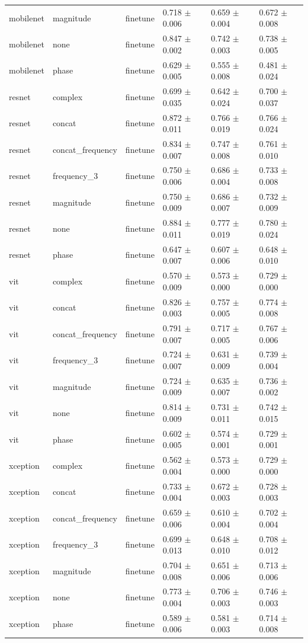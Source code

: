 \begin{table}
\begin{tabular}{llllll}
mobilenet & magnitude & finetune & 0.718 $\pm$ 0.006 & 0.659 $\pm$ 0.004 & 0.672 $\pm$ 0.008 \\
mobilenet & none & finetune & 0.847 $\pm$ 0.002 & 0.742 $\pm$ 0.003 & 0.738 $\pm$ 0.005 \\
mobilenet & phase & finetune & 0.629 $\pm$ 0.005 & 0.555 $\pm$ 0.008 & 0.481 $\pm$ 0.024 \\
resnet & complex & finetune & 0.699 $\pm$ 0.035 & 0.642 $\pm$ 0.024 & 0.700 $\pm$ 0.037 \\
resnet & concat & finetune & 0.872 $\pm$ 0.011 & 0.766 $\pm$ 0.019 & 0.766 $\pm$ 0.024 \\
resnet & concat_frequency & finetune & 0.834 $\pm$ 0.007 & 0.747 $\pm$ 0.008 & 0.761 $\pm$ 0.010 \\
resnet & frequency_3 & finetune & 0.750 $\pm$ 0.006 & 0.686 $\pm$ 0.004 & 0.733 $\pm$ 0.008 \\
resnet & magnitude & finetune & 0.750 $\pm$ 0.009 & 0.686 $\pm$ 0.007 & 0.732 $\pm$ 0.009 \\
resnet & none & finetune & 0.884 $\pm$ 0.011 & 0.777 $\pm$ 0.019 & 0.780 $\pm$ 0.024 \\
resnet & phase & finetune & 0.647 $\pm$ 0.007 & 0.607 $\pm$ 0.006 & 0.648 $\pm$ 0.010 \\
vit & complex & finetune & 0.570 $\pm$ 0.009 & 0.573 $\pm$ 0.000 & 0.729 $\pm$ 0.000 \\
vit & concat & finetune & 0.826 $\pm$ 0.003 & 0.757 $\pm$ 0.005 & 0.774 $\pm$ 0.008 \\
vit & concat_frequency & finetune & 0.791 $\pm$ 0.007 & 0.717 $\pm$ 0.005 & 0.767 $\pm$ 0.006 \\
vit & frequency_3 & finetune & 0.724 $\pm$ 0.007 & 0.631 $\pm$ 0.009 & 0.739 $\pm$ 0.004 \\
vit & magnitude & finetune & 0.724 $\pm$ 0.009 & 0.635 $\pm$ 0.007 & 0.736 $\pm$ 0.002 \\
vit & none & finetune & 0.814 $\pm$ 0.009 & 0.731 $\pm$ 0.011 & 0.742 $\pm$ 0.015 \\
vit & phase & finetune & 0.602 $\pm$ 0.005 & 0.574 $\pm$ 0.001 & 0.729 $\pm$ 0.001 \\
xception & complex & finetune & 0.562 $\pm$ 0.004 & 0.573 $\pm$ 0.000 & 0.729 $\pm$ 0.000 \\
xception & concat & finetune & 0.733 $\pm$ 0.004 & 0.672 $\pm$ 0.003 & 0.728 $\pm$ 0.003 \\
xception & concat_frequency & finetune & 0.659 $\pm$ 0.006 & 0.610 $\pm$ 0.004 & 0.702 $\pm$ 0.004 \\
xception & frequency_3 & finetune & 0.699 $\pm$ 0.013 & 0.648 $\pm$ 0.010 & 0.708 $\pm$ 0.012 \\
xception & magnitude & finetune & 0.704 $\pm$ 0.008 & 0.651 $\pm$ 0.006 & 0.713 $\pm$ 0.006 \\
xception & none & finetune & 0.773 $\pm$ 0.004 & 0.706 $\pm$ 0.003 & 0.746 $\pm$ 0.003 \\
xception & phase & finetune & 0.589 $\pm$ 0.006 & 0.581 $\pm$ 0.003 & 0.714 $\pm$ 0.008 \\
\bottomrule
\end{tabular}
\end{table}


